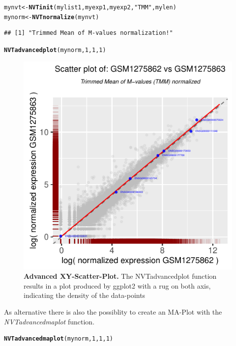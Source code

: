\documentclass[11pt]{article}\usepackage[]{graphicx}\usepackage[usenames,dvipsnames]{color}
\makeatletter
\newcommand{\hlnum}[1]{\textcolor[rgb]{0.686,0.059,0.569}{#1}}%
\newcommand{\hlstr}[1]{\textcolor[rgb]{0.192,0.494,0.8}{#1}}%
\newcommand{\hlstd}[1]{\textcolor[rgb]{0.345,0.345,0.345}{#1}}%
\newcommand{\hlkwb}[1]{\textcolor[rgb]{0.69,0.353,0.396}{#1}}%
\newcommand{\hlkwd}[1]{\textcolor[rgb]{0.737,0.353,0.396}{\textbf{#1}}}%
\newenvironment{kframe}{%
 \def\at@end@of@kframe{}%
 \ifinner\ifhmode%
  \def\at@end@of@kframe{\end{minipage}}%
  \begin{minipage}{\columnwidth}%
 \fi\fi%
 \def\FrameCommand##1{\hskip\@totalleftmargin \hskip-\fboxsep
 \colorbox{shadecolor}{##1}\hskip-\fboxsep
     \hskip-\linewidth \hskip-\@totalleftmargin \hskip\columnwidth}%
 \MakeFramed {\advance\hsize-\width
   \@totalleftmargin\z@ \linewidth\hsize
   \@setminipage}}%
 {\par\unskip\endMakeFramed%
 \at@end@of@kframe}
\newenvironment{knitrout}{}{} %
\makeatother
\begin{document}
\begin{knitrout}
\color{fgcolor}\begin{kframe}
\begin{alltt}
\hlstd{mynvt} \hlkwb{<-} \hlkwd{NVTinit}\hlstd{(mylist1,myexp1,myexp2,}\hlstr{"TMM"}\hlstd{,mylen)}
\hlstd{mynorm} \hlkwb{<-} \hlkwd{NVTnormalize}\hlstd{(mynvt)}
\end{alltt}
\begin{verbatim}
## [1] "Trimmed Mean of M-values normalization!"
\end{verbatim}
\begin{alltt}
\hlkwd{NVTadvancedplot}\hlstd{(mynorm,}\hlnum{1}\hlstd{,}\hlnum{1}\hlstd{,}\hlnum{1}\hlstd{)}
\end{alltt}
\end{kframe}
\end{knitrout}

\begin{figure}[!h]
\centering
\includegraphics[width=.8\textwidth]{figure/advancedplot-1}
\caption{
  \textbf{Advanced XY-Scatter-Plot.}
  The NVTadvancedplot function results in a plot produced by ggplot2 with a rug on both axis, indicating the density of the data-points}
\label{fig:adXY}
\end{figure}

\newpage

As alternative there is also the possiblity to create an MA-Plot with the \textit{NVTadvancedmaplot} function.

\begin{knitrout}
\color{fgcolor}\begin{kframe}
\begin{alltt}
\hlkwd{NVTadvancedmaplot}\hlstd{(mynorm,}\hlnum{1}\hlstd{,}\hlnum{1}\hlstd{,}\hlnum{1}\hlstd{)}
\end{alltt}
\end{kframe}
\end{knitrout}
\end{document}

